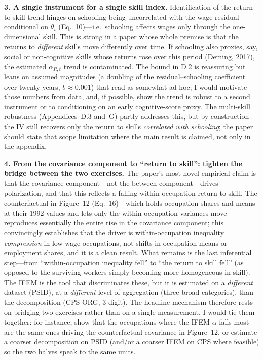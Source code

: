 \documentclass[11pt]{article}
\begin{document}
\textbf{3. A single instrument for a single skill index.}
Identification of the return-to-skill trend hinges on schooling being uncorrelated with the wage
residual conditional on $\theta_i$ (Eq.~10)---i.e.\ schooling affects wages only through the
one-dimensional skill. This is strong in a paper whose whole premise is that the returns to
\emph{different} skills move differently over time. If schooling also proxies, say, social or
non-cognitive skills whose returns rose over this period (Deming, 2017), the estimated
$\alpha_{R,t}$ trend is contaminated. The bound in D.2 is reassuring but leans on assumed magnitudes
(a doubling of the residual--schooling coefficient over twenty years, $b\approx0.001$) that read as
somewhat ad hoc; I would motivate those numbers from data, and, if possible, show the trend is robust
to a second instrument or to conditioning on an early cognitive-score proxy. The multi-skill
robustness (Appendices~D.3 and~G) partly addresses this, but by construction the IV still recovers
only the return to skills \emph{correlated with schooling}; the paper should state that scope
limitation where the main result is claimed, not only in the appendix.

\textbf{4. From the covariance component to ``return to skill'': tighten the bridge between the two
exercises.} The paper's most novel empirical claim is that the covariance component---not the
between component---drives polarization, and that this reflects a falling within-occupation return
to skill. The counterfactual in Figure~12 (Eq.~16)---which holds occupation shares and means at their
1992 values and lets only the within-occupation variances move---reproduces essentially the entire
rise in the covariance component; this convincingly establishes that the driver is within-occupation
inequality \emph{compression} in low-wage occupations, not shifts in occupation means or employment
shares, and it is a clean result. What remains is the last inferential step---from ``within-occupation
inequality fell'' to ``the return to skill fell'' (as opposed to the surviving workers simply becoming
more homogeneous in skill). The
IFEM is the tool that discriminates these, but it is estimated on a \emph{different} dataset (PSID),
at a \emph{different} level of aggregation (three broad categories), than the decomposition (CPS-ORG,
3-digit). The headline mechanism therefore rests on bridging two exercises rather than on a single
measurement. I would tie them together: for instance, show that the occupations where the IFEM
$\alpha$ falls most are the same ones driving the counterfactual covariance in Figure~12, or estimate
a coarser decomposition on PSID (and/or a coarser IFEM on CPS where feasible) so the two halves speak
to the same units.
\end{document}
